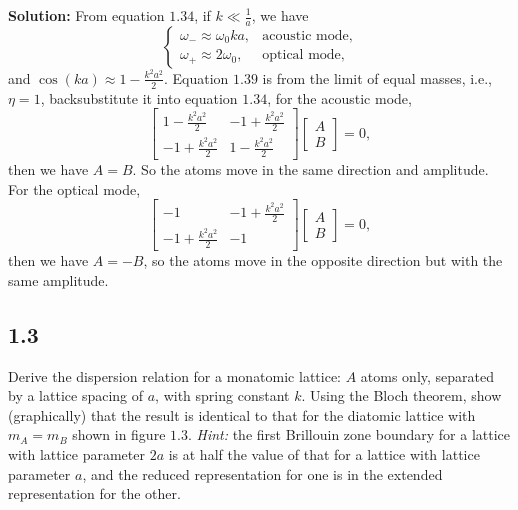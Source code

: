 \documentclass[12pt]{article}
\begin{document}
\textbf{Solution:}
From equation $1.34$, if $k \ll \frac{1}{a}$, we have
\begin{equation}
	\begin{cases}
		\omega_{-} \approx \omega_0 k a, & \text{acoustic mode}, \\
		\omega_{+} \approx 2 \omega_0,   & \text{optical mode},
	\end{cases}
\end{equation}
and $\cos (k a) \approx 1 - \frac{k^2 a^2}{2}$.
Equation $1.39$ is from the limit of equal masses, i.e., $\eta = 1$, backsubstitute it into equation $1.34$,
for the acoustic mode,
\begin{equation}
	\begin{bmatrix}
		1 - \frac{k^2 a^2}{2}  & -1 + \frac{k^2 a^2}{2} \\
		-1 + \frac{k^2 a^2}{2} & 1 - \frac{k^2 a^2}{2}
	\end{bmatrix}
	\begin{bmatrix}
		A \\
		B
	\end{bmatrix} = 0,
\end{equation}
then we have $A = B$. So the atoms move in the same direction and amplitude.
For the optical mode,
\begin{equation}
	\begin{bmatrix}
		-1                     & -1 + \frac{k^2 a^2}{2} \\
		-1 + \frac{k^2 a^2}{2} & -1
	\end{bmatrix}
	\begin{bmatrix}
		A \\
		B
	\end{bmatrix} = 0,
\end{equation}
then we have $A = -B$, so the atoms move in the opposite direction but with the same amplitude.

\subsection{1.3}

Derive the dispersion relation for a monatomic lattice: $A$ atoms only,
separated by a lattice spacing of $a$, with spring constant $k$.
Using the Bloch theorem, show (graphically) that the result is
identical to that for the diatomic lattice with $m_A = m_B$ shown in figure $1.3$.
\textit{Hint:} the first Brillouin zone boundary for a lattice with lattice parameter
$2a$ is at half the value of that for a lattice with lattice parameter $a$,
and the reduced representation for one is in the extended representation for the other.
\end{document}
